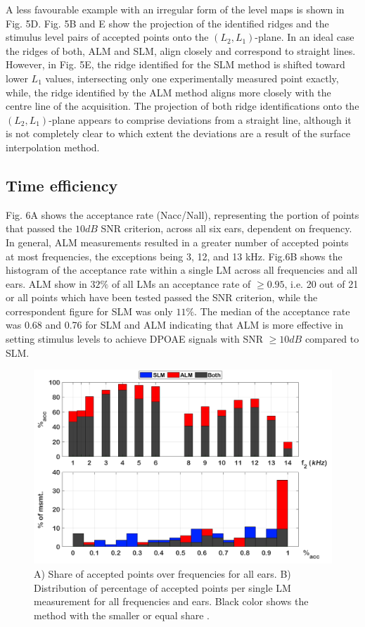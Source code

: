 \documentclass[journal,twoside,web]{ieeecolor2}
\begin{document}
A less favourable example with an irregular form of the level maps  is shown in Fig. 5D. Fig. 5B and E show the projection of the identified ridges and the stimulus level pairs of accepted points onto the $(L_2, L_1)$-plane. In an ideal case   the ridges of both, ALM and SLM, align closely and correspond to straight lines. However, in Fig. 5E,  the ridge identified for the SLM method is shifted toward lower $L_1$ values, intersecting only one experimentally measured point exactly, while, the ridge identified by the ALM method aligns more closely with the centre line of the acquisition. The projection of both ridge identifications onto the $(L_2, L_1)$-plane appears to comprise deviations from a straight line, although it is not completely clear to which extent the deviations are a result of the surface interpolation method.

\subsection{Time efficiency}
Fig. 6A shows the acceptance rate (Nacc/Nall), representing the portion of points that passed the $10 dB$ SNR criterion, across all six ears, dependent on frequency. In general, ALM measurements resulted in a greater number of accepted points at most frequencies, the exceptions being 3, 12, and 13 kHz. Fig.6B shows the histogram of the acceptance rate within a single LM across all frequencies and all ears. ALM show in $32\%$ of all LMs an acceptance rate of $\ge 0.95$, i.e. 20 out of 21 or all points which have been tested passed the SNR criterion, while the correspondent figure for SLM was only $11\%$. The median of the acceptance rate was 0.68 and 0.76 for SLM and ALM indicating that ALM is more effective in setting stimulus levels to achieve DPOAE signals with SNR $\ge10 dB$ compared to SLM.

\begin{figure}[ht]
\centerline{\includegraphics[width=\columnwidth]{Fig_Efficiency_v3.png}}
\caption{A) Share of accepted points over frequencies for all ears. B) Distribution of percentage of accepted points per single LM measurement for all frequencies and ears. Black color shows the method with the smaller or equal share .}
\label{fig_EFF}
\end{figure}
\end{document}
